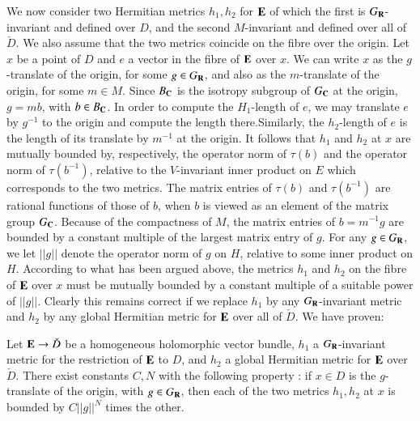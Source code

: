 We now consider two Hermitian metrics $h_1, h_2$ for $\mathbf{E}$ of which the first is $G_{\mathbf{R}}$-invariant and defined over $D$, and the second $M$-invariant and defined over  all of $\check{D}$. We also assume that the two metrics coincide on the fibre over the origin. Let $x$ be a point of $D$ and $e$ a vector in the fibre of $\mathbf{E}$ over $x$. We can write $x$ as the $g$-translate of the origin, for some $g \in G_{\mathbf{R}}$, and also as the $m$-translate of the origin, for some $m \in M$. Since $B_{\mathbf{C}}$ is the isotropy subgroup of $G_{\mathbf{C}}$ at the origin, $g = mb$, with $b \in B_{\mathbf{C}}$. In order to compute the $H_1$-length of $e$, we may translate $e$ by $g^{-1}$ to the origin and compute the length there.\pageoriginale Similarly, the $h_2$-length of $e$ is the length of its translate by $m^{-1}$ at the origin. It follows that $h_1$ and $h_2$ at $x$ are mutually bounded by, respectively, the operator norm of $\tau(b)$ and the operator norm of $\tau (b^{-1})$, relative to the $V$-invariant inner product on $E$ which corresponds to the two metrics. The matrix entries of $\tau (b)$ and $\tau (b^{-1})$ are rational functions of those of $b$, when $b$ is viewed as an element of the matrix group $G_{\mathbf{C}}$. Because of the compactness of $M$, the matrix entries of $b = m^{-1} g$ are bounded by a constant multiple of the largest matrix entry of $g$. For any $g \in G_{\mathbf{R}}$, we let $||g||$ denote the operator norm of $g$ on $H$, relative to some inner product on $H$. According to what has been argued above, the metrics $h_1$ and $h_2$ on the fibre of $\mathbf{E}$ over $x$ must be mutually bounded by a constant multiple of a suitable power of $||g||$. Clearly this remains correct if we replace $h_1$ by any $G_{\mathbf{R}}$-invariant metric and $h_2$ by any global Hermitian metric for $\mathbf{E}$ over all of $\check{D}$. We have proven:

\begin{lemma}\label{art4-lem3.19}
Let $\mathbf{E} \to \check{D}$ be a homogeneous holomorphic vector bundle, $h_1$ a $G_{\mathbf{R}}$-invariant metric for the restriction of $\mathbf{E}$ to $D$, and $h_2$ a global Hermitian metric for $\mathbf{E}$ over $\check{D}$. There exist constants $C, N$ with the following property : if $x \in D$ is the $g$-translate of the origin, with $g \in G_{\mathbf{R}}$, then each of the two metrics $h_1, h_2$ at $x$ is bounded by $C ||g||^N$ times the other.
\end{lemma}


